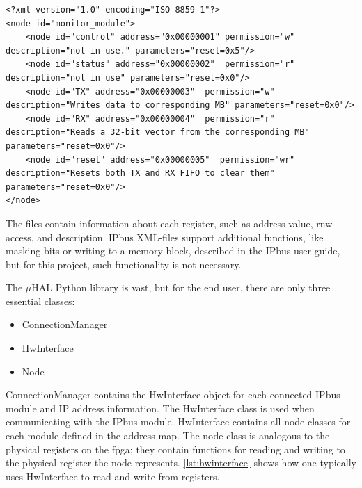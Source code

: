 \documentclass[main.tex]{subfiles}
\begin{document}
\begin{lstlisting}[caption={XML code for the com\_module used within IPbus software},captionpos=b, label=lst:foo]
<?xml version="1.0" encoding="ISO-8859-1"?>
<node id="monitor_module">
    <node id="control" address="0x00000001" permission="w" description="not in use." parameters="reset=0x5"/>
    <node id="status" address="0x00000002"  permission="r" description="not in use" parameters="reset=0x0"/>
    <node id="TX" address="0x00000003"  permission="w" description="Writes data to corresponding MB" parameters="reset=0x0"/>
    <node id="RX" address="0x00000004"  permission="r" description="Reads a 32-bit vector from the corresponding MB" parameters="reset=0x0"/>
    <node id="reset" address="0x00000005"  permission="wr" description="Resets both TX and RX FIFO to clear them" parameters="reset=0x0"/>
</node>

    \end{lstlisting}



The files contain information about each register, such as address value, \gls{rnw} access, and description. IPbus XML-files support additional functions, like masking bits or writing to a memory block, described in the IPbus user guide\cite{ipbus_guide}, but for this project, such functionality is not necessary.

The $\mu$HAL Python library is vast, but for the end user, there are only three essential classes:

\begin{itemize}
    \item ConnectionManager
    \item HwInterface
    \item Node
\end{itemize}

ConnectionManager contains the HwInterface object for each connected IPbus module and IP address information. The HwInterface class is used when communicating with the IPbus module. HwInterface contains all node classes for each module defined in the address map. The node class is analogous to the physical registers on the \gls{fpga}; they contain functions for reading and writing to the physical register the node represents. \autoref{lst:hwinterface} shows how one typically uses HwInterface to read and write from registers.

\end{document}
